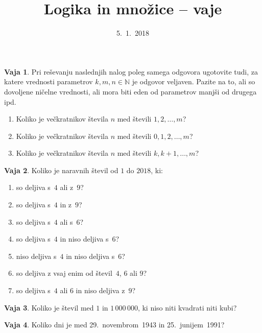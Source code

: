 \documentclass{article}
\newcommand{\NN}{\mathbb{N}}
\theoremstyle{definition}
\newtheorem{vaja}{Vaja}
\begin{document}
\title{Logika in množice -- vaje}
\date{5.~1.~2018}
\maketitle

\begin{vaja}
  Pri reševanju naslednjih nalog poleg samega odgovora ugotovite tudi, za katere vrednosti parametrov $k, m, n \in \NN$ je odgovor veljaven. Pazite na to, ali so dovoljene ničelne vrednosti, ali mora biti eden od parametrov manjši od drugega ipd.
  \begin{enumerate}
    \item
      Koliko je večkratnikov števila $n$ med števili $1, 2, \ldots, m$?
    \item
      Koliko je večkratnikov števila $n$ med števili $0, 1, 2, \ldots, m$?
    \item
      Koliko je večkratnikov števila $n$ med števili $k, k+1, \ldots, m$?
  \end{enumerate}
\end{vaja}

\begin{vaja}
  Koliko je naravnih števil od $1$ do $2018$, ki:
  \begin{enumerate}
    \item
      so deljiva s~$4$ ali z~$9$?
    \item
      so deljiva s~$4$ in z~$9$?
    \item
      so deljiva s~$4$ ali s~$6$?
    \item
      so deljiva s~$4$ in niso deljiva s~$6$?
    \item
      niso deljiva s~$4$ in niso deljiva s~$6$?
    \item
      so deljiva z vsaj enim od števil~$4$, $6$ ali $9$?
    \item
      so deljiva s~$4$ ali $6$ in niso deljiva z~$9$?
  \end{enumerate}
\end{vaja}

\begin{vaja}
  Koliko je števil med $1$ in $1\,000\,000$, ki niso niti kvadrati niti kubi?
\end{vaja}

\begin{vaja}
  Koliko dni je med 29.~novembrom~1943 in 25.~junijem~1991?
\end{vaja}
\end{document}

